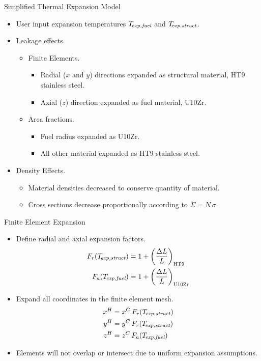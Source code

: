 \begin{frame}{Simplified Thermal Expansion Model}
  \begin{itemize}
    \item User input expansion temperatures ${T_{\!\mbox{\scriptsize \em exp,fuel}}}$ and $T_{\!\mbox{\scriptsize \em exp,struct}}$.
    \item Leakage effects.
      \begin{itemize}
        \item Finite Elements.
          \begin{itemize}
            \item Radial ($x$ and $y$) directions expanded as structural
              material, HT9 stainless steel.
            \item Axial ($z$) direction expanded as fuel material, U10Zr.
          \end{itemize}
        \item Area fractions.
          \begin{itemize}
            \item Fuel radius expanded as U10Zr.
            \item All other material expanded as HT9 stainless steel.
          \end{itemize}
      \end{itemize}
    \item Density Effects.
      \begin{itemize}
        \item Material densities decreased to conserve quantity of material.
        \item Cross sections decrease proportionally according to $\Sigma = N \,
          \sigma$.
      \end{itemize}
  \end{itemize}
\end{frame}

\begin{frame}{Finite Element Expansion}
  \begin{itemize}
    \item Define radial and axial expansion factors.
      \begin{align}
        \label{eq:lef_r}
        F_r(T_{\!\mbox{\scriptsize \em exp,struct}}) &= 1 + \left(\frac{\Delta L}{L}\right)_{\text{HT9}} \\
        \label{eq:lef_a}
        F_a({T_{\!\mbox{\scriptsize \em exp,fuel}}}) &= 1 + \left(\frac{\Delta L}{L}\right)_{\text{U10Zr}}
      \end{align}
    \item Expand all coordinates in the finite element mesh.
      \begin{align}
        \label{eq:expand_x}
        x^H &= x^C \, F_r(T_{\!\mbox{\scriptsize \em exp,struct}}) \\
        \label{eq:expand_y}
        y^H &= y^C \, F_r(T_{\!\mbox{\scriptsize \em exp,struct}}) \\
        \label{eq:expand_z}
        z^H &= z^C \, F_a({T_{\!\mbox{\scriptsize \em exp,fuel}}})
      \end{align}
    \item Elements will not overlap or intersect due to uniform expansion
      assumptions.
  \end{itemize}
\end{frame}

